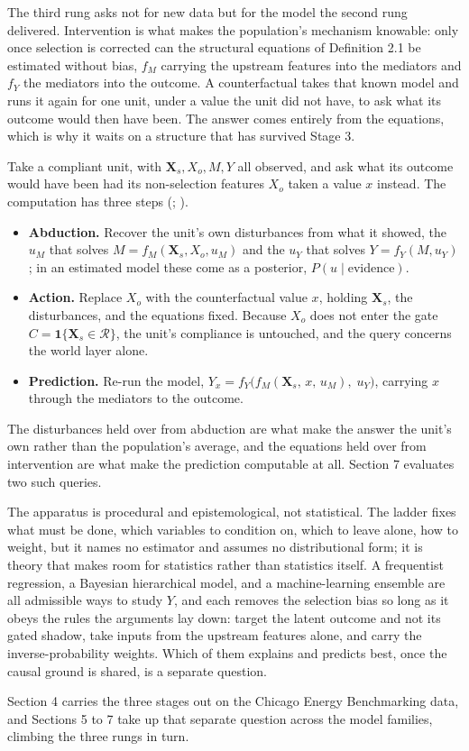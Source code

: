 The third rung asks not for new data but for the model the second rung delivered. Intervention is what makes the population's mechanism knowable: only once selection is corrected can the structural equations of Definition 2.1 be estimated without bias, $f_M$ carrying the upstream features into the mediators and $f_Y$ the mediators into the outcome. A counterfactual takes that known model and runs it again for one unit, under a value the unit did not have, to ask what its outcome would then have been. The answer comes entirely from the equations, which is why it waits on a structure that has survived Stage 3.

Take a compliant unit, with $\mathbf{X}_s, X_o, M, Y$ all observed, and ask what its outcome would have been had its non-selection features $X_o$ taken a value $x$ instead. The computation has three steps (; ).

\begin{itemize}
  \item \textbf{Abduction.} Recover the unit's own disturbances from what it showed, the $u_M$ that solves $M = f_M(\mathbf{X}_s, X_o, u_M)$ and the $u_Y$ that solves $Y = f_Y(M, u_Y)$; in an estimated model these come as a posterior, $P(u \mid \text{evidence})$.
  \item \textbf{Action.} Replace $X_o$ with the counterfactual value $x$, holding $\mathbf{X}_s$, the disturbances, and the equations fixed. Because $X_o$ does not enter the gate $C = \mathbf{1}\{\mathbf{X}_s \in \mathcal{R}\}$, the unit's compliance is untouched, and the query concerns the world layer alone.
  \item \textbf{Prediction.} Re-run the model, $Y_{x} = f_Y\big(f_M(\mathbf{X}_s,\, x,\, u_M),\; u_Y\big)$, carrying $x$ through the mediators to the outcome.
\end{itemize}

The disturbances held over from abduction are what make the answer the unit's own rather than the population's average, and the equations held over from intervention are what make the prediction computable at all. Section 7 evaluates two such queries.

The apparatus is procedural and epistemological, not statistical. The ladder fixes what must be done, which variables to condition on, which to leave alone, how to weight, but it names no estimator and assumes no distributional form; it is theory that makes room for statistics rather than statistics itself. A frequentist regression, a Bayesian hierarchical model, and a machine-learning ensemble are all admissible ways to study $Y$, and each removes the selection bias so long as it obeys the rules the arguments lay down: target the latent outcome and not its gated shadow, take inputs from the upstream features alone, and carry the inverse-probability weights. Which of them explains and predicts best, once the causal ground is shared, is a separate question.

Section 4 carries the three stages out on the Chicago Energy Benchmarking data, and Sections 5 to 7 take up that separate question across the model families, climbing the three rungs in turn.

